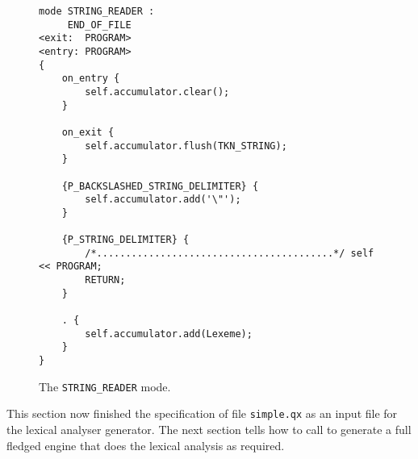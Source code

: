 \begin{figure}
\begin{lstlisting}
mode STRING_READER :
     END_OF_FILE
<exit:  PROGRAM>
<entry: PROGRAM>
{
    on_entry {
        self.accumulator.clear();
    }

    on_exit {
        self.accumulator.flush(TKN_STRING);
    }

    {P_BACKSLASHED_STRING_DELIMITER} {
        self.accumulator.add('\"');
    }

    {P_STRING_DELIMITER} {
        /*.........................................*/ self << PROGRAM;
        RETURN;
    }

    . {
        self.accumulator.add(Lexeme);
    }
}
\end{lstlisting}
\caption{The {\tt STRING\_READER} mode.}
\label{fig:string-reader-mode}
\end{figure}

This section now finished the specification of file {\tt simple.qx} as 
an input file for the {\quex} lexical analyser generator. The next section
tells how to call {\quex} to generate a full fledged engine that does the
lexical analysis as required.


